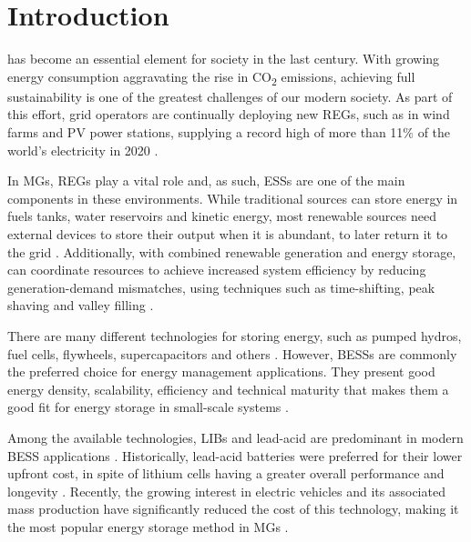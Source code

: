 \documentclass{ieeeaccess}
\begin{document}
    \maketitle

    \section{Introduction}
    \label{sec:introduction}
     has become an essential element for society in the last century. With growing energy consumption aggravating the rise in CO\textsubscript{2} emissions, achieving full sustainability is one of the greatest challenges of our modern society. As part of this effort, grid operators are continually deploying new \acp{REG}, such as in wind farms and \ac{PV} power stations, supplying a record high of more than 11\% of the world's electricity in 2020 \cite{EMBER2021}.

    In \acp{MG}, \acp{REG} play a vital role and, as such, \acp{ESS} are one of the main components in these environments. While traditional sources can store energy in fuels tanks, water reservoirs and kinetic energy, most renewable sources need external devices to store their output when it is abundant, to later return it to the grid \cite{STECCA2020}. Additionally, with combined renewable generation and energy storage,  can coordinate resources to achieve increased system efficiency by reducing generation-demand mismatches, using techniques such as time-shifting, peak shaving and valley filling \cite{WANG20196201, LI2020106058, PARRA2015576, ZHANG2019772}.

    There are many different technologies for storing energy, such as pumped hydros, fuel cells, flywheels, supercapacitors and others \cite{IBRAHIM2008}. However, \acp{BESS} are commonly the preferred choice for energy management applications. They present good energy density, scalability, efficiency and technical maturity that makes them a good fit for energy storage in small-scale systems \cite{KOCER2019, martins2018optimal, FU20136749070}.

    Among the available technologies, \acp{LIB} and lead-acid are predominant in modern \ac{BESS} applications \cite{FU20136749070, ALSAIDAN8094981}. Historically, lead-acid batteries were preferred for their lower upfront cost, in spite of lithium cells having a greater overall performance and longevity \cite{wang2013li, xu2010lithium}. Recently, the growing interest in electric vehicles and its associated mass production have significantly reduced the cost of this technology, making it the most popular energy storage method in \acp{MG} \cite{mongird20202020, BBERG2020, zhang2018energy}.
\end{document}

